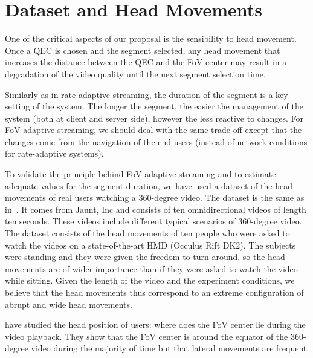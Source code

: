 \section{Dataset and Head Movements}

One of the critical aspects of our proposal is the sensibility to head movement. Once a QEC is chosen and the 
segment selected, any head movement that increases the distance between the QEC and the FoV center 
may result in a degradation of the video quality until the next segment selection time. 

Similarly as in rate-adaptive
streaming, the duration of the segment is a key setting of the system. The longer the segment, the easier
the management of the system (both at client and server side), however the less reactive to changes.
For FoV-adaptive streaming, we should deal with the same trade-off except that the changes come from 
the navigation of the end-users (instead of network conditions for rate-adaptive systems).

To validate the principle behind FoV-adaptive streaming and to estimate adequate values for
the segment duration, we have used a dataset of the head movements of real users watching
a 360-degree video. The dataset is the same as in~\cite{yu_framework_2015}. It comes from
Jaunt, Inc and consists of ten omnidirectional videos of length ten seconds. These videos include
different typical scenarios of 360-degree video. The dataset consists of the head movements of
ten people who were asked to watch the videos on a state-of-the-art \ac{HMD} (Occulus Rift DK2).
The subjects were standing and they were given the freedom to turn around, so the head movements
are of wider importance than if they were asked to watch the video while sitting. Given the length of
the video and the experiment conditions, we believe that the head movements thus correspond to 
an extreme configuration of abrupt and wide head movements.

\citet{yu_framework_2015} have studied the head position of users: where does the FoV center lie 
during the video playback. They show that the FoV center is around the equator of the 360-degree video
during the majority of time but that lateral movements are frequent.